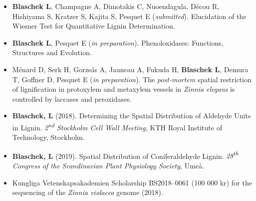 \documentclass[11pt]{article}
\begin{document}
\vspace{-0.175cm}
\begin{itemize}[label={},itemindent=-9pt,leftmargin=24pt]
	\itemsep-0.1cm
	\item \textbf{Blaschek L}, Champagne A, Dimotakis C, Nuoendagula, Décou R, Hishiyama S, Kratzer S, Kajita S, Pesquet E (\textit{submitted}). Elucidation of the Wiesner Test for Quantitative Lignin Determination.
	\item \textbf{Blaschek L}, Pesquet E (\textit{in preparation}). Phenoloxidases: Functions, Structures and Evolution.
	\item Ménard D, Serk H, Gorzsás A, Jauneau A, Fukuda H, \textbf{Blaschek L}, Demura T, Goffner D, Pesquet E (\textit{in preparation}). The \textit{post-mortem} spatial restriction of lignification in protoxylem and metaxylem vessels in \textit{Zinnia elegans} is controlled by laccases and peroxidases.
\end{itemize}
\vspace{0.3cm}

\vspace{-0.175cm}
\begin{itemize}[label={},itemindent=-9pt,leftmargin=24pt]
	\itemsep-0.1cm
	\item \textbf{Blaschek, L} (2018). Determining the Spatial Distribution of Aldehyde Units in Lignin. \textit{2\textsuperscript{nd} Stockholm Cell Wall Meeting}, KTH Royal Institute of Technology, Stockholm.
	\item \textbf{Blaschek, L} (2019). Spatial Distribution of Coniferaldehyde Lignin. \textit{28\textsuperscript{th} Congress of the Scandinavian Plant Physiology Society}, Umeå.
\end{itemize}
\vspace{0.3cm}

\vspace{-0.175cm}
\begin{itemize}[label={},itemindent=-9pt,leftmargin=24pt]
	\itemsep-0.1cm
	\item Kungliga Vetenskapsakademien Scholarship BS2018--0061 (100 000 kr) for the sequencing of the \textit{Zinnia violacea} genome (2018). 
\end{itemize}
\newpage
\end{document}
